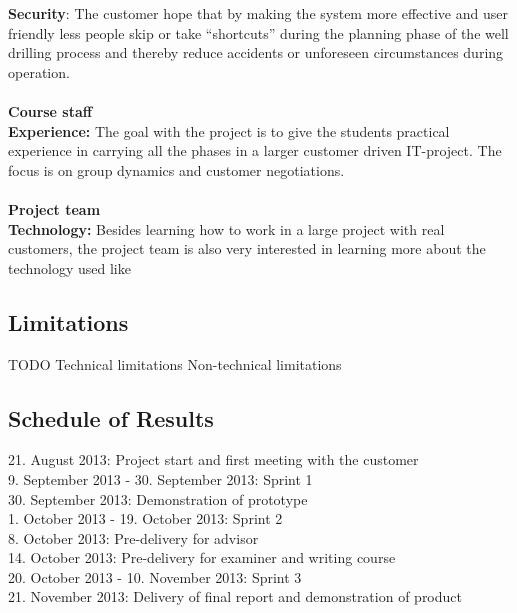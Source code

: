 \documentclass{report}
\begin{document}
\textbf{Security}: The customer hope that by making the system more effective and user friendly less people skip or take “shortcuts” during the planning phase of the well drilling process and thereby reduce accidents or unforeseen circumstances during operation.\\ \\
\textbf{Course staff}\\
\textbf{Experience:} The goal with the project is to give the students practical experience in carrying all the phases in a larger customer driven IT-project. The focus is on group dynamics and customer negotiations.\\ \\
\textbf{Project team}\\
\textbf{Technology:} Besides learning how to work in a large project with real customers, the project team is also very interested in learning more about the technology used like 
 
\subsection{Limitations} \label{subsec:limitations}
TODO
Technical limitations
Non-technical limitations

\subsection{Schedule of Results} \label{subsec:schedule_of_results}
21. August 2013: Project start and first meeting with the customer\\
9. September 2013 - 30. September 2013: Sprint 1\\
30. September 2013: Demonstration of prototype\\
1. October 2013 - 19. October 2013: Sprint 2\\
8. October 2013: Pre-delivery for advisor\\
14. October 2013: Pre-delivery for examiner and writing course\\
20. October 2013 - 10. November 2013: Sprint 3\\
21. November 2013: Delivery of final report and demonstration of product

\end{document}

